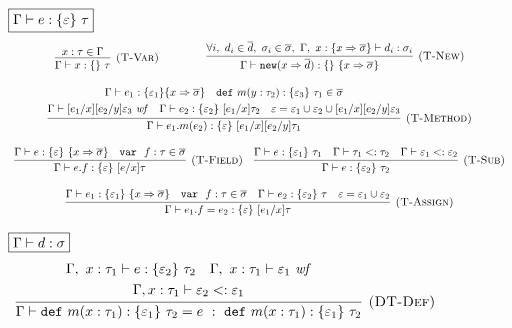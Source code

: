 \begin{figure}[tb]
\flushleft
\footnotesize{
\noindent$\fbox{$\Gamma \vdash e : \{ \varepsilon \}~\tau$}$
\[
\begin{array}{c}
\infer[\textsc{(T-Var)}]
  {\Gamma \vdash x : \{ \}~\tau}
  {x : \tau \in \Gamma} \quad \quad
~~~~~~~
\infer[\textsc{(T-New)}]
	{\Gamma \vdash \keywadj{new} (x \Rightarrow \overline{d}) : \{ \}~\{ x \Rightarrow \overline{\sigma} \}}
	{\forall i,~d_i \in \overline{d},~\sigma_i \in \overline{\sigma},~\Gamma,~x : \{ x \Rightarrow \overline{\sigma} \} \vdash d_i : \sigma_i}\\[3ex]
\infer[\textsc{(T-Method)}]
  {\Gamma \vdash e_1.m(e_2) : \{ \varepsilon \}~[e_1/x][e_2/y]\tau_1}
  {\begin{gathered} \Gamma \vdash e_1 : \{ \varepsilon_1 \} \{ x \Rightarrow \overline{\sigma} \}\quad \keyw{def} m(y : \tau_2) : \{ \varepsilon_3 \}~\tau_1 \in \overline{\sigma}\\
  \Gamma \vdash [e_1/x][e_2/y]\varepsilon_3~\mathit{wf}\quad \Gamma \vdash e_2 : \{ \varepsilon_2 \}~[e_1/x]\tau_2 \quad \varepsilon = \varepsilon_1 \cup \varepsilon_2 \cup [e_1/x][e_2/y]\varepsilon_3 \end{gathered}}\\[3ex]
\infer[\textsc{(T-Field)}]
	{\Gamma \vdash e.f : \{ \varepsilon \}~[e/x]\tau}
	{\Gamma \vdash e : \{ \varepsilon \}~\{ x \Rightarrow \overline{\sigma} \} & \keyw{var}~ f : \tau \in \overline{\sigma}} \quad 
\infer[\textsc{(T-Sub)}]
  {\Gamma \vdash e : \{ \varepsilon_2 \}~\tau_2}
  {\Gamma \vdash e : \{ \varepsilon_1 \}~\tau_1 & \Gamma \vdash \tau_1 <: \tau_2 & \Gamma \vdash \varepsilon_1 <: \varepsilon_2} \\[3ex]
\infer[\textsc{(T-Assign)}]
	{\Gamma \vdash  e_1.f=e_2 : \{ \varepsilon \}~[e_1/x]\tau}
	{\Gamma \vdash e_1 : \{ \varepsilon_1 \}~\{ x \Rightarrow \overline{\sigma} \} & \keyw{var}~ f : \tau \in \overline{\sigma} & \Gamma \vdash e_2 : \{ \varepsilon_2 \}~\tau & \varepsilon = \varepsilon_1 \cup \varepsilon_2}
\end{array}
\]


\noindent$\fbox{$\Gamma \vdash d : \sigma$}$
\[
\begin{array}{c}
\infer[\textsc{(DT-Def)}]
  {\Gamma \vdash \keyw{def} m(x : \tau_1) : \{ \varepsilon_1 \}~\tau_2 = e~:~\keyw{def} m(x : \tau_1) : \{ \varepsilon_1 \}~\tau_2}
  {\begin{gathered} \Gamma,~x : \tau_1 \vdash e : \{ \varepsilon_2 \}~\tau_2\quad\Gamma,~x : \tau_1 \vdash \varepsilon_1~\mathit{wf} \\
  \Gamma, x : \tau_1 \vdash \varepsilon_2 <: \varepsilon_1 \end{gathered}}\\[3ex]


\end{array}\]}
\end{figure}
